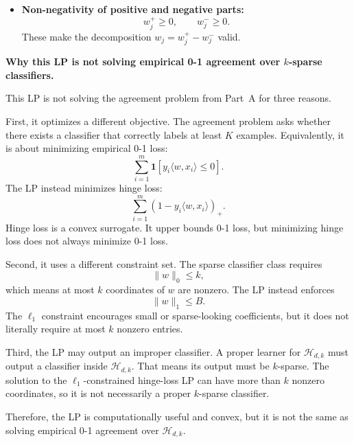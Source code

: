 \documentclass[11pt]{article}
\begin{document}
\begin{enumerate}
\begin{solutionbox}
\begin{itemize}[leftmargin=2em]
      \item \textbf{Non-negativity of positive and negative parts:}
      \[
      w_j^+\ge0,\qquad w_j^-\ge0.
      \]
      These make the decomposition $w_j=w_j^+-w_j^-$ valid.
    \end{itemize}

    \medskip

    \textbf{Why this LP is not solving empirical 0-1 agreement over $k$-sparse classifiers.}

    This LP is not solving the agreement problem from Part~A for three reasons.

    First, it optimizes a different objective. The agreement problem asks whether there exists a
    classifier that correctly labels at least $K$ examples. Equivalently, it is about minimizing
    empirical 0-1 loss:
    \[
    \sum_{i=1}^m \mathbf{1}[y_i\langle w,x_i\rangle\le0].
    \]
    The LP instead minimizes hinge loss:
    \[
    \sum_{i=1}^m(1-y_i\langle w,x_i\rangle)_+.
    \]
    Hinge loss is a convex surrogate. It upper bounds 0-1 loss, but minimizing hinge loss does
    not always minimize 0-1 loss.

    Second, it uses a different constraint set. The sparse classifier class requires
    \[
    \|w\|_0\le k,
    \]
    which means at most $k$ coordinates of $w$ are nonzero. The LP instead enforces
    \[
    \|w\|_1\le B.
    \]
    The $\ell_1$ constraint encourages small or sparse-looking coefficients, but it does not
    literally require at most $k$ nonzero entries.

    Third, the LP may output an improper classifier. A proper learner for
    $\mathcal{H}_{d,k}$ must output a classifier inside $\mathcal{H}_{d,k}$. That means its
    output must be $k$-sparse. The solution to the $\ell_1$-constrained hinge-loss LP can have
    more than $k$ nonzero coordinates, so it is not necessarily a proper $k$-sparse classifier.

    Therefore, the LP is computationally useful and convex, but it is not the same as solving
    empirical 0-1 agreement over $\mathcal{H}_{d,k}$.

    \end{solutionbox}


\end{enumerate}
\end{document}
